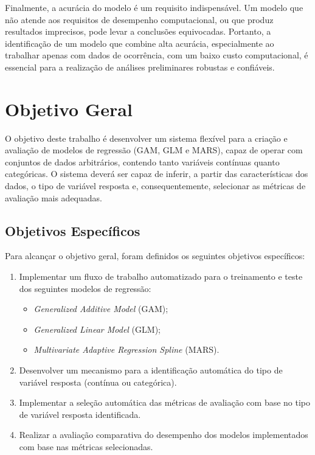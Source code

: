 \documentclass[
    12pt,               %
    openright,          %
    oneside,            %
    a4paper,            %
    english,            %
    brazil              %
    ]{abntex2}
\begin{document}
Finalmente, a acurácia do modelo é um requisito indispensável. Um modelo que não atende aos requisitos de desempenho computacional, 
ou que produz resultados imprecisos, pode levar a conclusões equivocadas. Portanto, a identificação de um modelo que combine alta 
acurácia, especialmente ao trabalhar apenas com dados de ocorrência, com um baixo custo computacional, é essencial para a realização 
de análises preliminares robustas e confiáveis.

\section{Objetivo Geral}

O objetivo deste trabalho é desenvolver um sistema flexível para a criação e avaliação de modelos de regressão 
(GAM, GLM e MARS), capaz de operar com conjuntos de dados arbitrários, contendo tanto variáveis contínuas quanto categóricas. 
O sistema deverá ser capaz de inferir, a partir das características dos dados, o tipo de variável resposta e, consequentemente, 
selecionar as métricas de avaliação mais adequadas.

\subsection{Objetivos Específicos}

Para alcançar o objetivo geral, foram definidos os seguintes objetivos específicos:

\begin{enumerate}
    \item Implementar um fluxo de trabalho automatizado para o treinamento e teste dos seguintes modelos de regressão:
    \begin{itemize}
        \item \textit{Generalized Additive Model} (GAM);
        \item \textit{Generalized Linear Model} (GLM);
        \item \textit{Multivariate Adaptive Regression Spline} (MARS).
    \end{itemize}
    \item Desenvolver um mecanismo para a identificação automática do tipo de variável resposta (contínua ou categórica).
    \item Implementar a seleção automática das métricas de avaliação com base no tipo de variável resposta identificada.
    \item Realizar a avaliação comparativa do desempenho dos modelos implementados com base nas métricas selecionadas.
\end{enumerate}
\end{document}
